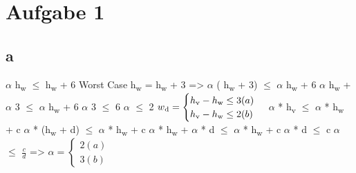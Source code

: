 \section*{Aufgabe 1}
\subsection*{a}
$\alpha$ h\textsubscript{w} $\leq$ h\textsubscript{w} + 6 \newline
Worst Case h\textsubscript{w} = h\textsubscript{w} + 3  \newline
=> $\alpha$ ( h\textsubscript{w} + 3) $\leq$ $\alpha$ h\textsubscript{w} + 6  \newline
$\alpha$ h\textsubscript{w} + $\alpha$ 3 $\leq$ $\alpha$ h\textsubscript{w} + 6  \newline
$\alpha$ 3 $\leq$  6  \newline
$\alpha$ $\leq$  2  \newline
$w\textsubscript{d}  = \begin{cases}
    h\textsubscript{v} - h\textsubscript{w} \leq 3 (a) \\
    h\textsubscript{v} - h\textsubscript{w} \leq 2 (b)
\end{cases}$
$\alpha$ * h\textsubscript{v} $\leq$ $\alpha$ * h\textsubscript{w} + c  \newline
$\alpha$ * (h\textsubscript{w} + d) $\leq$ $\alpha$ * h\textsubscript{w} + c  \newline
$\alpha$ * h\textsubscript{w} + $\alpha$ * d $\leq$ $\alpha$ * h\textsubscript{w} + c  \newline
$\alpha$ * d $\leq$ c  \newline
$\alpha$ $\leq$ $\frac{c}{d}$\newline
=> $\alpha  = \begin{cases}
    2 (a) \\
    3 (b)
\end{cases}$
